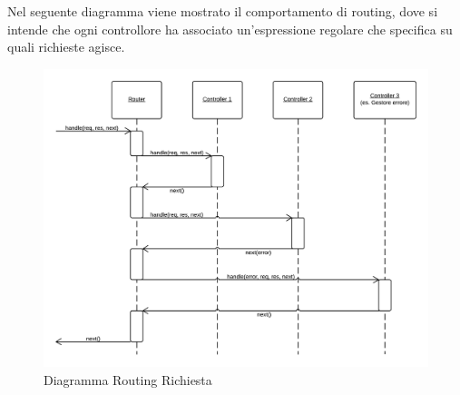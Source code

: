 Nel seguente diagramma viene mostrato il comportamento di routing, dove si intende che ogni controllore ha associato un'espressione regolare che specifica su quali richieste agisce. 
\begin{figure}[H]
	\begin{center} 
		\includegraphics[scale=0.27]{scenari/Diagramma Routing Richiesta.png} 
		\caption{Diagramma Routing Richiesta}
	\end{center} 
\end{figure}

